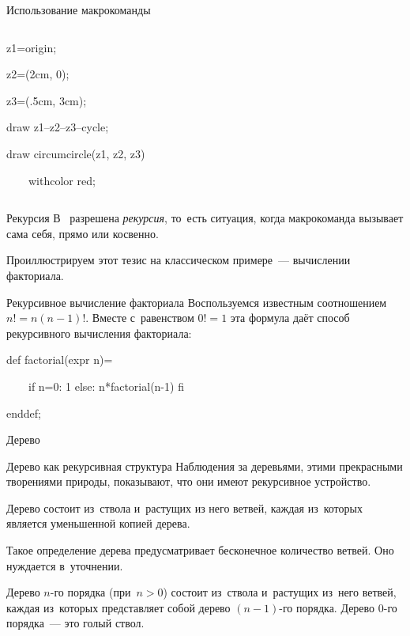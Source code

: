 \begin{frame}{Использование макрокоманды }
\begin{columns}
\begin{programlisting}
z1=origin;\par
z2=(2cm, 0);\par
z3=(.5cm, 3cm);\par
draw z1--z2--z3--cycle;\par
draw circumcircle(z1, z2, z3)\par
~~~~withcolor red;
\end{programlisting}
\end{columns}
\end{frame}

\begin{frame}{Рекурсия}
В~ разрешена \emph{рекурсия}, то~есть ситуация, когда
макрокоманда вызывает сама себя, прямо или косвенно.

Проиллюстрируем этот тезис на классическом примере~— вычислении факториала.
\end{frame}

\begin{frame}{Рекурсивное вычисление факториала}
Воспользуемся известным соотношением $n!=n(n-1)!$. Вместе с~равенством $0!=1$
эта формула даёт способ рекурсивного вычисления факториала:

\begin{programlisting}
def factorial(expr n)=\par
~~~~if n=0: 1 else: n*factorial(n-1) fi\par
enddef;
\end{programlisting}
\end{frame}

\begin{frame}{Дерево}
\centerline{}
\end{frame}

\begin{frame}{Дерево как рекурсивная структура}
Наблюдения за деревьями, этими прекрасными творениями природы, показывают, что
они имеют рекурсивное устройство.

Дерево состоит из~ствола и~растущих из него ветвей, каждая из~которых является
уменьшенной копией дерева.

Такое определение дерева предусматривает бесконечное количество ветвей. Оно
нуждается в~уточнении.

Дерево $n$-го порядка (при $n>0$) состоит из~ствола и~растущих из~него ветвей,
каждая из~которых представляет собой дерево $(n-1)$-го порядка. Дерево $0$-го
порядка~— это голый ствол.
\end{frame}

